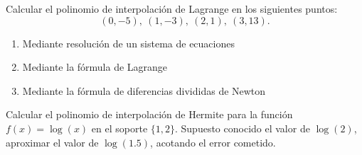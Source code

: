 \documentclass[11pt]{article}
\begin{document}
\begin{problemas}
  \begin{problema}
    Calcular el polinomio de interpolación de Lagrange en los
    siguientes puntos:
    $$
    (0,-5),\ (1,-3),\ (2,1),\ (3,13).
    $$
    \begin{enumerate}
    \item Mediante resolución de un sistema de ecuaciones
    \item Mediante la fórmula de Lagrange
    \item Mediante la fórmula de diferencias divididas de Newton
    \end{enumerate}
  \end{problema}
  

  \begin{problema}
    Calcular el polinomio de interpolación de Hermite para la función
    $f(x)=\log(x)$ en el soporte $\{1,2\}$. Supuesto conocido el valor
      de $\log(2)$, aproximar el valor de $\log(1.5)$, acotando el
      error cometido.
  \end{problema}
  
  \begin{problema}
    
  \end{problema}
  \end{problemas}
\end{document}
